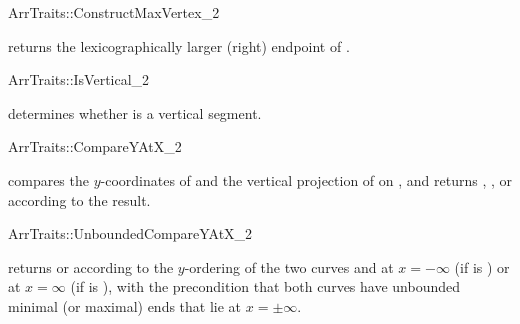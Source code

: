 \ccRefPageBegin
\begin{ccRefConcept}{ArrTraits::ConstructMaxVertex_2}

\ccHasModels{}

  {returns the lexicographically larger (right) endpoint of .}
\end{ccRefConcept}
\ccRefPageEnd

\ccRefPageBegin
\begin{ccRefConcept}{ArrTraits::IsVertical_2}

\ccHasModels{}

  {determines whether  is a vertical segment.}
\end{ccRefConcept}
\ccRefPageEnd

\ccRefPageBegin
\begin{ccRefConcept}{ArrTraits::CompareYAtX_2}

\ccHasModels{}

  {compares the $y$-coordinates of  and the vertical 
  projection of  on , and returns , ,
  or  according to the result.}
\end{ccRefConcept}
\ccRefPageEnd

\ccRefPageBegin
\begin{ccRefConcept}{ArrTraits::UnboundedCompareYAtX_2}
\ccRefines{}

\ccHasModels{}

  {returns  or  according to the
  $y$-ordering of the two curves  and  at $x = -\infty$
  (if  is ) or at $x = \infty$ (if  is 
  ), with the precondition that both curves have unbounded
  minimal (or maximal) ends that lie at $x = \pm\infty$.}
\end{ccRefConcept}
\ccRefPageEnd

